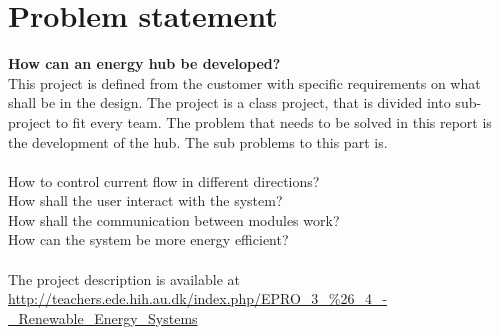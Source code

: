 \chapter{Problem statement}
\textbf{How can an energy hub be developed?}\\
This project is defined from the customer with specific requirements on what shall be in the design. The project is a class project, that is divided into sub-project to fit every team. The problem that needs to be solved in this report is the development of the hub. The sub problems to this part is.\\
\\
How to control current flow in different directions?\\
How shall the user interact with the system?\\
How shall the communication between modules work?\\
How can the system be more energy efficient?\\
\\
The project description is available at \url{http://teachers.ede.hih.au.dk/index.php/EPRO_3_%26_4_-_Renewable_Energy_Systems}
